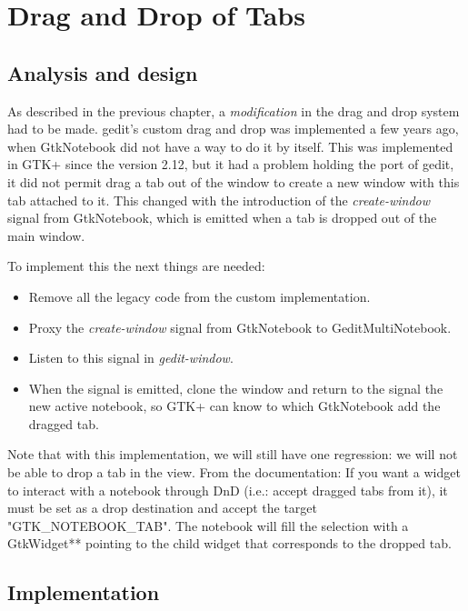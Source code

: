 
\chapter{Drag and Drop of Tabs}


\section{Analysis and design}

As described in the previous chapter, a \emph{modification} in the drag and drop system had to be made. gedit's custom drag and drop was implemented a few years ago, when GtkNotebook did not have a way to do it by itself. This was implemented in GTK+ since the version 2.12, but it had a problem holding the port of gedit, it did not permit drag a tab out of the window to create a new window with this tab attached to it. This changed with the introduction of the \emph{create-window} signal from GtkNotebook, which is emitted when a tab is dropped out of the main window.

To implement this the next things are needed:
\begin{itemize}
  \item Remove all the legacy code from the custom implementation.
  \item Proxy the \emph{create-window} signal from GtkNotebook to GeditMultiNotebook.
  \item Listen to this signal in \emph{gedit-window}.
  \item When the signal is emitted,  clone the window and return to the signal the new active notebook, so GTK+ can know to which GtkNotebook add the dragged tab.
\end{itemize}

Note that with this implementation,  we will still have one regression: we will not be able to drop a tab in the view. From the documentation: If you want a widget to interact with a notebook through DnD (i.e.: accept dragged tabs from it),  it must be set as a drop destination and accept the target "GTK\_NOTEBOOK\_TAB". The notebook will fill the selection with a GtkWidget** pointing to the child widget that corresponds to the dropped tab.

\section{Implementation}

